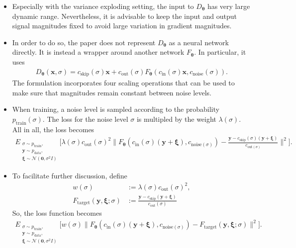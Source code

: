 \documentclass[10pt]{article}
\newcommand{\ve}[1]{\mathbf{#1}}
\newcommand{\ves}[1]{\boldsymbol{#1}}
\newcommand{\mrm}[1]{\mathrm{#1}}
\newcommand{\mcal}[1]{\mathcal{#1}}
\newcommand{\data}{\mathrm{data}}
\begin{document}
\begin{itemize}
  \item Especially with the variance exploding setting, the input to $D_{\ves{\theta}}$ has very large dynamic range. Nevertheless, it is advisable to keep the input and output signal magnitudes fixed to avoid large variation in gradient magnitudes.

  \item In order to do so, the paper does not represent $D_{\ves{\theta}}$ as a neural network directly. It is instead a wrapper around another network $F_{\ves{\theta}}$. In particular, it uses
  \begin{align*}
    D_{\ves{\theta}}(\ve{x}, \sigma) = c_{\mrm{skip}}(\sigma) \ve{x} + c_{\mrm{out}}(\sigma) F_{\ves{\theta}}(c_{\mrm{in}}(\sigma) \ve{x}, c_{\mrm{noise}}(\sigma)).
  \end{align*}
  The formulation incorporates four scaling operations that can be used to make sure that magnitudes remain constant between noise levels.

  \item When training, a noise level is sampled according to the probability $p_{\mrm{train}}(\sigma)$. The loss for the noise level $\sigma$ is multipled by the weight $\lambda(\sigma)$. All in all, the loss becomes
  \begin{align*}
    E_{
      \substack{
        \sigma \sim p_{\mrm{train}}, \\
        \ve{y} \sim p_{\data}, \\
        \ves{\xi} \sim \mcal{N}(\ve{0}, \sigma^2 I)
      }
    }
    \bigg[
      \lambda(\sigma) c_{\mrm{out}}(\sigma)^2
      \bigg\|
        F_{\ves{\theta}}(c_{\mrm{in}}(\sigma)(\ve{y} + \ves{\xi}), c_{\mrm{noise}(\sigma)})
        - \frac{\ve{y} - c_{\mrm{skip}}(\sigma)(\ve{y} + \ves{\xi})}{c_{\mrm{out}(\sigma)}}
      \bigg\|^2
    \bigg].
  \end{align*}

  \item To facilitate further discussion, define
  \begin{align*}
    w(\sigma) &:= \lambda(\sigma) c_{\mrm{out}}(\sigma)^2, \\
    F_{\mrm{target}}(\ve{y}, \ves{\xi}; \sigma) &:= \frac{\ve{y} - c_{\mrm{skip}}(\ve{y} + \ves{\xi})}{c_{\mrm{out}}(\sigma)}
  \end{align*}
  So, the loss function becomes
  \begin{align*}
    E_{
      \substack{
        \sigma \sim p_{\mrm{train}}, \\
        \ve{y} \sim p_{\data}, \\
        \ves{\xi} \sim \mcal{N}(\ve{0}, \sigma^2 I)
      }
    }
    \Big[
      w(\sigma)
      \Big\|
        F_{\ves{\theta}}(c_{\mrm{in}}(\sigma)(\ve{y} + \ves{\xi}), c_{\mrm{noise}(\sigma)})
        - F_{\mrm{target}}(\ve{y}, \ves{\xi}; \sigma)
      \Big\|^2
    \Big].
  \end{align*}


\end{itemize}
\end{document}
